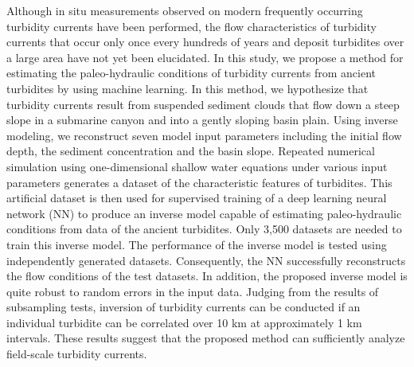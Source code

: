 
  Although in situ measurements observed on modern frequently occurring turbidity currents have been performed, the flow characteristics of turbidity currents that occur only once every hundreds of years and deposit turbidites over a large area have not yet been elucidated. In this study, we propose a method for estimating the paleo-hydraulic conditions of turbidity currents from ancient turbidites by using machine learning. In this method, we hypothesize that turbidity currents result from suspended sediment clouds that flow down a steep slope in a submarine canyon and into a gently sloping basin plain. Using inverse modeling, we reconstruct seven model input parameters including the initial flow depth, the sediment concentration and the basin slope. Repeated numerical simulation using one-dimensional shallow water equations  under various input parameters generates a dataset of the characteristic features of turbidites. This artificial dataset is then used for supervised training of a deep learning neural network (NN) to produce an inverse model capable of estimating paleo-hydraulic conditions from data of the ancient turbidites. Only 3,500 datasets are needed to train this inverse model. The performance of the inverse model is tested using independently generated datasets. Consequently, the NN successfully reconstructs the flow conditions of the test datasets. In addition, the proposed inverse model is quite robust to random errors in the input data. Judging from the results of subsampling tests, inversion of turbidity currents can be conducted if an individual turbidite can be correlated over 10 km at approximately 1 km intervals. These results suggest that the proposed method can sufficiently analyze field-scale turbidity currents.